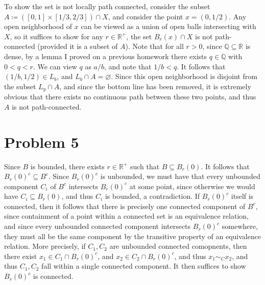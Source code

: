 \documentclass[11pt, letterpaper]{article}
\begin{document}
To show the set is not locally path connected, consider the subset $A\coloneqq ([0,1] \times [1/3,2/3]) \cap X$, and consider the point $x=(0,1/2)$. Any open neighborhood of $x$ can be viewed as a union of open balls intersecting with $X$, so it suffices to show for any $r\in\mathbb{R} ^+$, the set $B_r(x) \cap X$ is not path-connected (provided it is a subset of $A$). Note that for all $r>0$, since $\mathbb{Q} \subseteq \mathbb{R} $ is dense, by a lemma I proved on a previous homework there exists $q\in\mathbb{Q} $ with $0<q<r$. We can view $q$ as $a/b$, and note that $1/b<q$. It follows that $(1/b,1/2)\in L_b$, and $L_b \cap A=\varnothing $. Since this open neighborhood is disjoint from the subset $L_y \cap A$, and since the bottom line has been removed, it is extremely obvious that there exists no continuous path between these two points, and thus $A$ is not path-connected.
\section*{Problem 5}
Since $B$ is bounded, there exists $r\in\mathbb{R} ^+$ such that $B\subseteq B_r(0)$. It follows that $B_r(0)^{c} \subseteq B^{c} $. Since $B_r(0)^{c} $ is unbounded, we must have that every unbounded component $C_i$ of $B^{c} $ intersects $B_r(0)^{c} $ at some point, since otherwise we would have $C_i \subseteq B_r(0)$, and thus $C_i$ is bounded, a contradiction. If $B_r(0)^{c} $ itself is connected, then it follows that there is precisely one connected component of $B^{c} $, since containment of a point within a connected set is an equivalence relation, and since every unbounded connected component intersects $B_r(0)^{c} $ somewhere, they must all be the same component by the transitive property of an equivalence relation. More precisely, if $C_1,C_2$ are unbounded connected comopnents, then there exist $x_1\in C_1 \cap B_r(0)^{c} $, and $x_2\in C_2 \cap B_r(0)^{c} $, and thus $x_1\sim_C x_2$, and thus $C_1,C_2$ fall within a single connected component. It then suffices to show $B_r(0)^{c} $ is connected.
\end{document}
